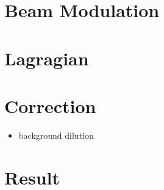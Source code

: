\section{Beam Modulation}

\section{Lagragian}

\section{Correction}
\begin{itemize}
    \item background dilution
\end{itemize}
\section{Result}

